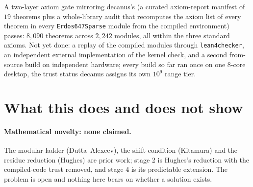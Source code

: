 \documentclass[11pt]{article}
\begin{document}
\begin{center}
\end{center}

A two-layer axiom gate mirroring decanus's (a curated axiom-report manifest of $19$ theorems plus a whole-library audit that recomputes the axiom list of every theorem in every \texttt{Erdos647Sparse} module from the compiled environment) passes: $8{,}090$ theorems across $2{,}242$ modules, all within the three standard axioms. Not yet done: a replay of the compiled modules through \texttt{lean4checker}, an independent external implementation of the kernel check, and a second from-source build on independent hardware; every build so far ran once on one 8-core desktop, the trust status decanus assigns its own $10^{9}$ range tier.

\section{What this does and does not show}\label{sec:limits}

\paragraph{Mathematical novelty: none claimed.} The modular ladder (Dutta--Alexeev), the shift condition (Kitamura) and the residue reduction (Hughes) are prior work; stage 2 is Hughes's reduction with the compiled-code trust removed, and stage 4 is its predictable extension. The problem is open and nothing here bears on whether a solution exists.
\end{document}
